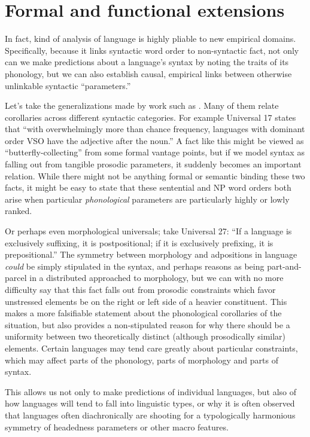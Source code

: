 \documentclass{article}
\begin{document}
\section{Formal and functional extensions\label{exten}}

In fact, kind of analysis of language is highly pliable to new empirical domains.
Specifically, because it links syntactic word order to non-syntactic fact, not only can we make predictions about a language's syntax by noting the traits of its phonology, but we can also establish causal, empirical links between otherwise unlinkable syntactic ``parameters.''

Let's take the generalizations made by work such as \textcite{greenberg63}.
Many of them relate corollaries across different syntactic categories.
For example Universal 17 states that ``with overwhelmingly more than chance frequency, languages with dominant order VSO have the adjective after the noun.''
A fact like this might be viewed as ``butterfly-collecting'' from some formal vantage points, but if we model syntax as falling out from tangible prosodic parameters, it suddenly becomes an important relation.
While there might not be anything formal or semantic binding these two facts, it might be easy to state that these sentential and NP word orders both arise when particular \textit{phonological} parameters are particularly highly or lowly ranked.

Or perhaps even morphological universals; take Universal 27: ``If a language is exclusively suffixing, it is postpositional; if it is exclusively prefixing, it is prepositional.''
The symmetry between morphology and adpositions in language \emph{could} be simply stipulated in the syntax, and perhaps reasons as being part-and-parcel in a distributed approached to morphology, but we can with no more difficulty say that this fact falls out from prosodic constraints which favor unstressed elements be on the right or left side of a heavier constituent.
This makes a more falsifiable statement about the phonological corollaries of the situation, but also provides a non-stipulated reason for why there should be a uniformity between two theoretically distinct (although prosodically similar) elements.
Certain languages may tend care greatly about particular constraints, which may affect parts of the phonology, parts of morphology and parts of syntax.

This allows us not only to make predictions of individual languages, but also of how languages will tend to fall into linguistic types, or why it is often observed that languages often diachronically are shooting for a typologically harmonious symmetry of headedness parameters or other macro features.
\end{document}

